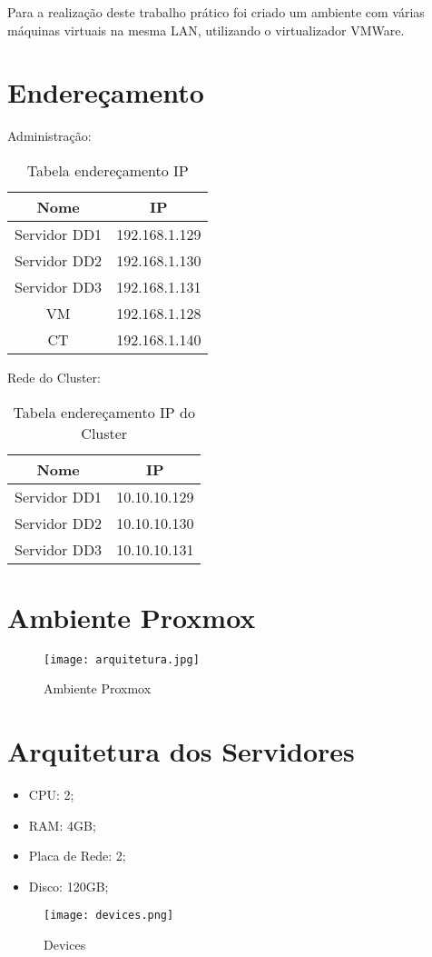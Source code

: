 Para a realização deste trabalho prático foi criado um ambiente com várias máquinas virtuais na mesma \ac{LAN}, utilizando o virtualizador VMWare.

\section{Endereçamento}

Administração:

\begin{table}[h]
\begin{center}
\begin{tabular}{||c c||} 
 \hline
 Nome & IP\\ [0.5ex] 
 \hline\hline
 Servidor DD1 & 192.168.1.129\\ 
 \hline
 Servidor DD2 & 192.168.1.130\\
 \hline
 Servidor DD3 & 192.168.1.131\\
 \hline
 VM & 192.168.1.128\\
 \hline
 CT & 192.168.1.140\\
 \hline
\end{tabular}
\caption{Tabela endereçamento \ac{IP}}
\end{center}
\end{table}

Rede do Cluster:

\begin{table}[h]
\begin{center}
\begin{tabular}{||c c||} 
 \hline
 Nome & IP\\ [0.5ex] 
 \hline\hline
 Servidor DD1 & 10.10.10.129\\ 
 \hline
 Servidor DD2 & 10.10.10.130\\
 \hline
 Servidor DD3 & 10.10.10.131\\
 \hline
\end{tabular}
\caption{Tabela endereçamento \ac{IP} do Cluster}
\end{center}
\end{table}

\section{Ambiente Proxmox}
\begin{figure}[H]
\center
\texttt{[image: arquitetura.jpg]}
\caption{Ambiente Proxmox}
\end{figure}

\section{Arquitetura dos Servidores}
\begin{itemize}
    \item CPU: 2;
    \item RAM: 4GB;
    \item Placa de Rede: 2;
    \item Disco: 120GB;
\end{itemize}

\begin{figure}[H]
\center
\texttt{[image: devices.png]}
\caption{Devices}
\end{figure}
